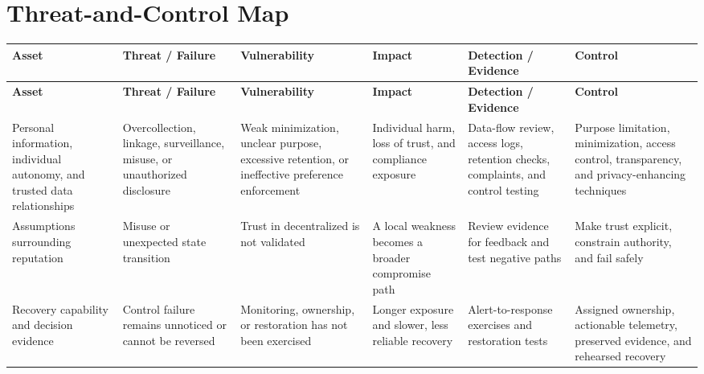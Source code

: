 \documentclass[11pt,letterpaper]{article}
\begin{document}
\section*{Threat-and-Control Map}
\begingroup\scriptsize\setlength{\tabcolsep}{2pt}
\begin{longtable}{>{\raggedright\arraybackslash}p{}>{\raggedright\arraybackslash}p{}>{\raggedright\arraybackslash}p{}>{\raggedright\arraybackslash}p{}>{\raggedright\arraybackslash}p{}>{\raggedright\arraybackslash}p{}}
\toprule\rowcolor{Navy}\color{white}\textbf{Asset} & \color{white}\textbf{Threat / Failure} & \color{white}\textbf{Vulnerability} & \color{white}\textbf{Impact} & \color{white}\textbf{Detection / Evidence} & \color{white}\textbf{Control}\\\midrule
\endfirsthead
\toprule\rowcolor{Navy}\color{white}\textbf{Asset} & \color{white}\textbf{Threat / Failure} & \color{white}\textbf{Vulnerability} & \color{white}\textbf{Impact} & \color{white}\textbf{Detection / Evidence} & \color{white}\textbf{Control}\\\midrule
\endhead
Personal information, individual autonomy, and trusted data relationships & Overcollection, linkage, surveillance, misuse, or unauthorized disclosure & Weak minimization, unclear purpose, excessive retention, or ineffective preference enforcement & Individual harm, loss of trust, and compliance exposure & Data-flow review, access logs, retention checks, complaints, and control testing & Purpose limitation, minimization, access control, transparency, and privacy-enhancing techniques\\\midrule
Assumptions surrounding reputation & Misuse or unexpected state transition & Trust in decentralized is not validated & A local weakness becomes a broader compromise path & Review evidence for feedback and test negative paths & Make trust explicit, constrain authority, and fail safely\\\midrule
Recovery capability and decision evidence & Control failure remains unnoticed or cannot be reversed & Monitoring, ownership, or restoration has not been exercised & Longer exposure and slower, less reliable recovery & Alert-to-response exercises and restoration tests & Assigned ownership, actionable telemetry, preserved evidence, and rehearsed recovery\\\midrule
\bottomrule
\end{longtable}
\endgroup
\end{document}
